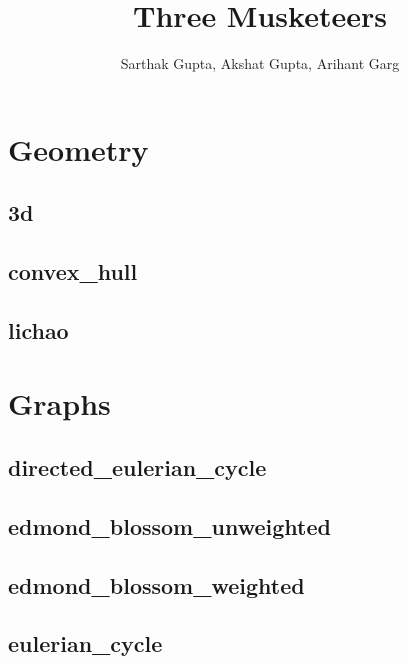 \documentclass[a4paper, twocolumn]{article}
\title{{\Huge Three Musketeers}\\\vspace{5em}{\Large IIT Bhubaneswar}}
\author{Sarthak Gupta, Akshat Gupta, Arihant Garg}
\begin{document}
\begin{titlepage}
\maketitle
\thispagestyle{empty}
\pagebreak
\pagestyle{fancy}
\lhead{}
\rhead{}
\cfoot{}
\tableofcontents
\end{titlepage}

\pagestyle{fancy}
\cfoot{- \thepage \ -}
  
\section{Geometry}
\subsection{3d}

\subsection{convex\_hull}

\subsection{lichao}

\section{Graphs}
\subsection{directed\_eulerian\_cycle}

\subsection{edmond\_blossom\_unweighted}

\subsection{edmond\_blossom\_weighted}

\subsection{eulerian\_cycle}

\end{document}
